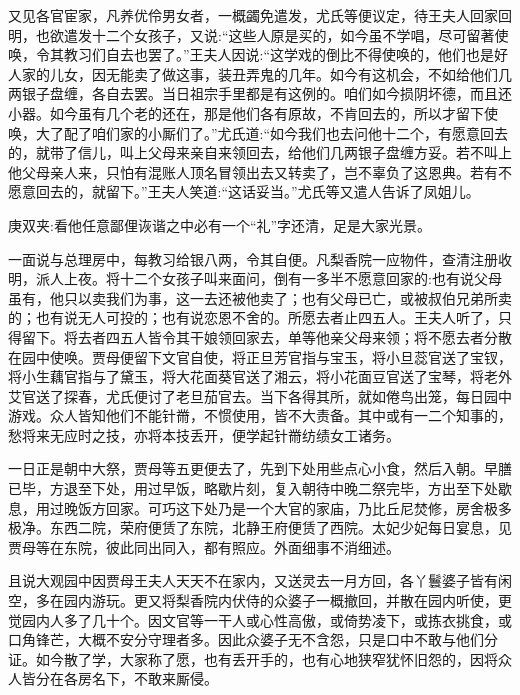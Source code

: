 \begin{parag}
    又见各官宦家，凡养优伶男女者，一概蠲免遣发，尤氏等便议定，待王夫人回家回明，也欲遣发十二个女孩子，又说:“这些人原是买的，如今虽不学唱，尽可留著使唤，令其教习们自去也罢了。”王夫人因说:“这学戏的倒比不得使唤的，他们也是好人家的儿女，因无能卖了做这事，装丑弄鬼的几年。如今有这机会，不如给他们几两银子盘缠，各自去罢。当日祖宗手里都是有这例的。咱们如今损阴坏德，而且还小器。如今虽有几个老的还在，那是他们各有原故，不肯回去的，所以才留下使唤，大了配了咱们家的小厮们了。”尤氏道:“如今我们也去问他十二个，有愿意回去的，就带了信儿，叫上父母来亲自来领回去，给他们几两银子盘缠方妥。若不叫上他父母亲人来，只怕有混账人顶名冒领出去又转卖了，岂不辜负了这恩典。若有不愿意回去的，就留下。”王夫人笑道:“这话妥当。”尤氏等又遣人告诉了凤姐儿。\begin{note}庚双夹:看他任意鄙俚诙谐之中必有一个“礼”字还清，足是大家光景。\end{note}一面说与总理房中，每教习给银八两，令其自便。凡梨香院一应物件，查清注册收明，派人上夜。将十二个女孩子叫来面问，倒有一多半不愿意回家的:也有说父母虽有，他只以卖我们为事，这一去还被他卖了；也有父母已亡，或被叔伯兄弟所卖的；也有说无人可投的；也有说恋恩不舍的。所愿去者止四五人。王夫人听了，只得留下。将去者四五人皆令其干娘领回家去，单等他亲父母来领；将不愿去者分散在园中使唤。贾母便留下文官自使，将正旦芳官指与宝玉，将小旦蕊官送了宝钗，将小生藕官指与了黛玉，将大花面葵官送了湘云，将小花面豆官送了宝琴，将老外艾官送了探春，尤氏便讨了老旦茄官去。当下各得其所，就如倦鸟出笼，每日园中游戏。众人皆知他们不能针黹，不惯使用，皆不大责备。其中或有一二个知事的，愁将来无应时之技，亦将本技丢开，便学起针黹纺绩女工诸务。
\end{parag}


\begin{parag}
    一日正是朝中大祭，贾母等五更便去了，先到下处用些点心小食，然后入朝。早膳已毕，方退至下处，用过早饭，略歇片刻，复入朝待中晚二祭完毕，方出至下处歇息，用过晚饭方回家。可巧这下处乃是一个大官的家庙，乃比丘尼焚修，房舍极多极净。东西二院，荣府便赁了东院，北静王府便赁了西院。太妃少妃每日宴息，见贾母等在东院，彼此同出同入，都有照应。外面细事不消细述。
\end{parag}


\begin{parag}
    且说大观园中因贾母王夫人天天不在家内，又送灵去一月方回，各丫鬟婆子皆有闲空，多在园内游玩。更又将梨香院内伏侍的众婆子一概撤回，并散在园内听使，更觉园内人多了几十个。因文官等一干人或心性高傲，或倚势凌下，或拣衣挑食，或口角锋芒，大概不安分守理者多。因此众婆子无不含怨，只是口中不敢与他们分证。如今散了学，大家称了愿，也有丢开手的，也有心地狭窄犹怀旧怨的，因将众人皆分在各房名下，不敢来厮侵。
\end{parag}



